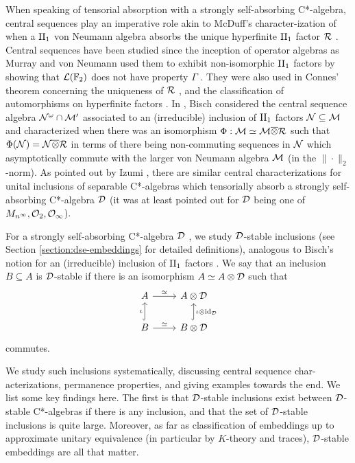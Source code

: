 \documentclass[12pt]{amsart}
\begin{document}
  When speaking of tensorial absorption with a strongly self-absorbing C*-algebra, central sequences play an imperative role akin to McDuff's character\hyp{}ization of when a $\text{II}_1$ von Neumann algebra absorbs the unique hyperfinite $\text{II}_1$ factor $\mathcal{R}$ \cite{McDuff69}. Central sequences have been studied since the inception of operator algebras as Murray and von Neumann used them to exhibit non-isomorphic $\text{II}_1$ factors by showing that $\mathcal{L}(\mathbb{F}_2)$ does not have property $\Gamma$ \cite{MvNIV}. They were also used in Connes' theorem concerning the uniqueness of $\mathcal{R}$ \cite{Connes76}, and the classification of automorphisms on hyperfinite factors \cite{Connes75,Connes76}. In \cite{Bisch90,Bisch94}, Bisch considered the central sequence algebra $\mathcal{N}^\omega \cap \mathcal{M}'$ associated to an (irreducible) inclusion of $\text{II}_1$ factors $\mathcal{N} \subseteq \mathcal{M}$ and characterized when there was an isomorphism $\Phi: \mathcal{M} \simeq \mathcal{M} \overline{\otimes} \mathcal{R}$ such that $\Phi(\mathcal{N}) = \mathcal{N} \overline{\otimes} \mathcal{R}$ in terms of there being non-commuting sequences in $\mathcal{N}$ which asymptotically commute with the larger von Neumann algebra $\mathcal{M}$ (in the $\|\cdot\|_2$-norm). As pointed out by Izumi \cite{Izumi04}, there are similar central characterizations for unital inclusions of separable C*-algebras which tensorially absorb a strongly self-absorbing C*-algebra $\mathcal{D}$ (it was at least pointed out for $\mathcal{D}$ being one of $M_{n^{\infty}},\mathcal{O}_2,\mathcal{O}_{\infty}$).

  For a strongly self-absorbing C*-algebra $\mathcal{D}$ \cite[Definition 1.3(iv)]{TomsWinter07}, we study $\mathcal{D}$-stable
  inclusions (see Section \ref{section:dse-embeddings} for detailed definitions), analogous to Bisch's notion for an (irreducible) inclusion of $\text{II}_1$ factors \cite{Bisch90}. We say that an inclusion $B \subseteq A$ is $\mathcal{D}$-stable if there is an isomorphism $A \simeq A \otimes \mathcal{D}$ such that
\begin{equation}
  \begin{tikzcd}
A \arrow[r, "\simeq"]                 & A \otimes \cD                 \\
B \arrow[r, "\simeq"] \arrow[u, hook, "\iota"] & B \otimes \cD \arrow[u, hook, "\iota \otimes \id_\cD"']
\end{tikzcd}
\end{equation}
commutes.

We study such inclusions systematically, discussing central sequence char\hyp{}acterizations, permanence properties, and giving examples towards the end. We list some key findings here.  The first is that $\mathcal{D}$-stable inclusions exist between $\mathcal{D}$-stable C*-algebras if there is any inclusion, and that the set of $\mathcal{D}$-stable inclusions is quite large. Moreover, as far as classification of embeddings up to approximate unitary equivalence (in particular by $K$-theory and traces), $\mathcal{D}$-stable embeddings are all that matter. 
\end{document}
